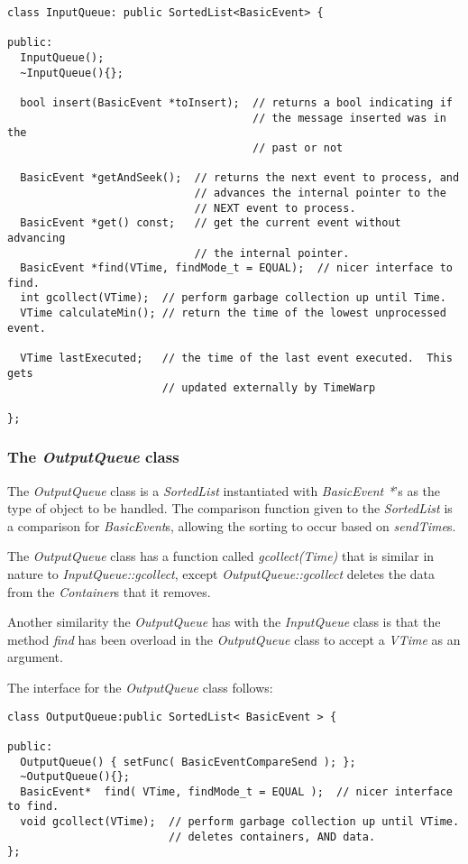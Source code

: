 \documentclass[11pt]{report}
\begin{document}
\begin{verbatim} 
class InputQueue: public SortedList<BasicEvent> {

public:
  InputQueue();
  ~InputQueue(){};
 
  bool insert(BasicEvent *toInsert);  // returns a bool indicating if
                                      // the message inserted was in the
                                      // past or not

  BasicEvent *getAndSeek();  // returns the next event to process, and
                             // advances the internal pointer to the 
                             // NEXT event to process.
  BasicEvent *get() const;   // get the current event without advancing
                             // the internal pointer.
  BasicEvent *find(VTime, findMode_t = EQUAL);  // nicer interface to find.
  int gcollect(VTime);  // perform garbage collection up until Time.
  VTime calculateMin(); // return the time of the lowest unprocessed event.

  VTime lastExecuted;   // the time of the last event executed.  This gets
                        // updated externally by TimeWarp

};
\end{verbatim}

\subsubsection{The {\it OutputQueue} class}

The {\it OutputQueue} class is a {\it SortedList} instantiated with {\it
BasicEvent *}'s as the type of object to be handled. The comparison
function given to the {\it SortedList} is a comparison for {\it
BasicEvent}s, allowing the sorting to occur based on {\it sendTime}s.

The {\it OutputQueue} class has a function called {\it gcollect(Time)}
that is similar in nature to {\it InputQueue::gcollect}, except {\it
OutputQueue::gcollect} deletes the data from the {\it Container}s that it
removes.

Another similarity the {\it OutputQueue} has with the {\it InputQueue}
class is that the method {\it find} has been overload in the {\it
OutputQueue} class to accept a {\it VTime} as an argument.

The interface for the {\it OutputQueue} class follows:

\begin{verbatim}
class OutputQueue:public SortedList< BasicEvent > {

public:
  OutputQueue() { setFunc( BasicEventCompareSend ); };
  ~OutputQueue(){};
  BasicEvent*  find( VTime, findMode_t = EQUAL );  // nicer interface to find.
  void gcollect(VTime);  // perform garbage collection up until VTime.  
                         // deletes containers, AND data.
};
\end{verbatim}
\end{document}
